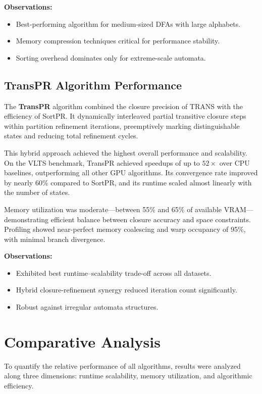 \textbf{Observations:}
\begin{itemize}
    \item Best-performing algorithm for medium-sized DFAs with large alphabets.
    \item Memory compression techniques critical for performance stability.
    \item Sorting overhead dominates only for extreme-scale automata.
\end{itemize}

\subsection{TransPR Algorithm Performance}

The \textbf{TransPR} algorithm combined the closure precision of TRANS with the efficiency of SortPR. It dynamically interleaved partial transitive closure steps within partition refinement iterations, preemptively marking distinguishable states and reducing total refinement cycles.

This hybrid approach achieved the highest overall performance and scalability. On the VLTS benchmark, TransPR achieved speedups of up to $52\times$ over CPU baselines, outperforming all other GPU algorithms. Its convergence rate improved by nearly 60\% compared to SortPR, and its runtime scaled almost linearly with the number of states.

Memory utilization was moderate—between 55\% and 65\% of available VRAM—demonstrating efficient balance between closure accuracy and space constraints. Profiling showed near-perfect memory coalescing and warp occupancy of 95\%, with minimal branch divergence.

\textbf{Observations:}
\begin{itemize}
    \item Exhibited best runtime–scalability trade-off across all datasets.
    \item Hybrid closure-refinement synergy reduced iteration count significantly.
    \item Robust against irregular automata structures.
\end{itemize}

\section{Comparative Analysis}

To quantify the relative performance of all algorithms, results were analyzed along three dimensions: runtime scalability, memory utilization, and algorithmic efficiency.

